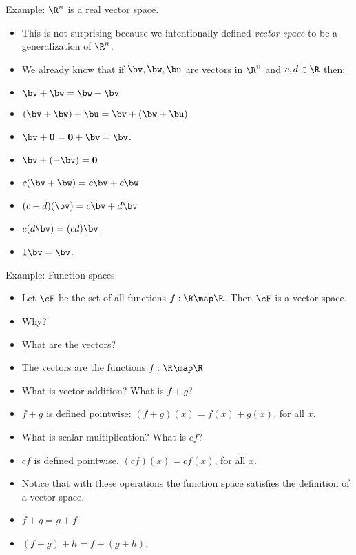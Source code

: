 \documentclass{beamer}
\begin{document}
\begin{frame}{Example: $\R^n$ is a real vector space.}

\begin{itemize}
\item This is not surprising because we intentionally defined \emph{vector space}
to be a generalization of $\R^n$.
\item We already know that if $\bv, \bw, \bu$ are vectors in $\R^n$ and
$c,d\in\R$ then:
\item $\bv+\bw = \bw + \bv$
\item $(\bv + \bw) + \bu = \bv + (\bw + \bu)$
\item $\bv + \textbf{0} = \textbf{0} + \bv = \bv$.
\item $\bv + (-\bv) = \textbf{0}$
\item $c(\bv + \bw) = c\bv + c\bw$
\item $(c+d)(\bv) = c\bv + d\bv$
\item $c(d\bv) = (c d) \bv$.
\item $1 \bv = \bv$.
\end{itemize}
\end{frame}

\begin{frame}{Example: Function spaces}

\begin{itemize}
\item Let $\cF$ be the set of all functions $f:\R\map\R$. Then $\cF$
is a vector space.
\item Why?
\item What are the vectors?
\item The vectors are the functions $f:\R\map\R$
\item What is vector addition? What is $f+g$?
\item $f+g$ is defined pointwise: $(f+g)(x) = f(x) + g(x)$, for all $x$.
\item What is scalar multiplication? What is $cf$?
\item $cf$ is defined pointwise. $(cf)(x) = cf(x)$, for all $x$.
\item Notice that with these operations the function space satisfies
the definition of a vector space.
\item $f+g = g+f$.
\item $(f+g) + h = f + (g+h)$.
\end{itemize}
\end{frame}
\end{document}
